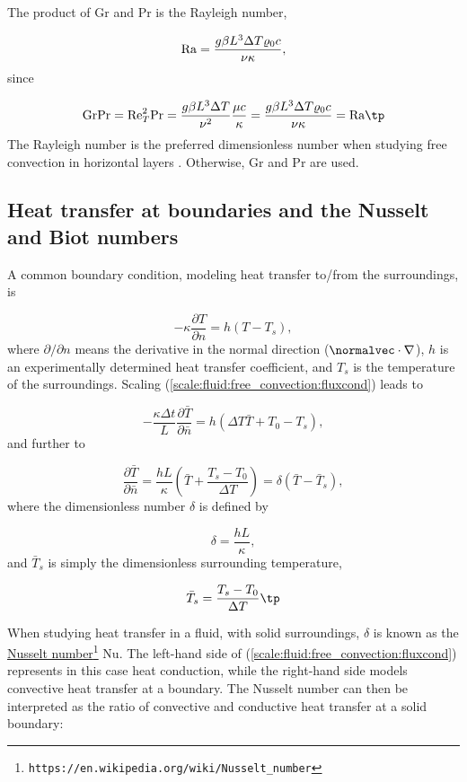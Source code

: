\documentclass[graybox,envcountchap,sectrefs,final]{svmonodo}
\begin{document}
The product of Gr and Pr is the Rayleigh number,

\[
\hbox{Ra} = \frac{g\beta L^3\Delta T\varrho_0 c}{\nu\kappa},
\]
since

\[
\hbox{Gr} \hbox{Pr} = \hbox{Re}_T^2\hbox{Pr} =
\frac{g\beta L^3 \Delta T}{\nu^2}\frac{\mu c}{\kappa} =
\frac{g\beta L^3 \Delta T\varrho_0 c}{\nu\kappa} =
\hbox{Ra}\tp
\]
The Rayleigh number is the preferred dimensionless number when studying
free convection in horizontal layers \cite{Drazin_Reid,Tritton}. Otherwise,
Gr and Pr are used.


\subsection{Heat transfer at boundaries and the Nusselt and Biot numbers}


A common boundary condition, modeling heat transfer to/from the
surroundings, is

\begin{equation}
-\kappa\frac{\partial T}{\partial n} = h(T - T_s),
\label{scale:fluid:free_convection:fluxcond}
\end{equation}
where $\partial/\partial n$ means the derivative in the normal direction
($\normalvec\cdot\nabla$), $h$ is an experimentally determined
heat transfer coefficient, and $T_s$ is the temperature of
the surroundings. Scaling (\ref{scale:fluid:free_convection:fluxcond})
leads to

\[ -\frac{\kappa\Delta t}{L}\frac{\partial \bar T}{\partial \bar n} = h(\Delta T \bar T + T_0 - T_s),\]
and further to

\[ \frac{\partial \bar T}{\partial \bar n} =
\frac{hL}{\kappa}(\bar T + \frac{T_s - T_0}{\Delta T})
= \delta(\bar T - \bar T_s),
\]
where the dimensionless number $\delta$ is defined by

\[ \delta = \frac{hL}{\kappa},\]
and $\bar T_s$ is simply the dimensionless surrounding temperature,

\[ \bar T_s = \frac{T_s - T_0}{\Delta T}\tp\]

When studying heat transfer in a fluid, with solid surroundings,
$\delta$ is known as the \href{{https://en.wikipedia.org/wiki/Nusselt_number}}{Nusselt number}\footnote{\texttt{https://en.wikipedia.org/wiki/Nusselt\_number}} Nu.  The left-hand side
of (\ref{scale:fluid:free_convection:fluxcond}) represents in this case
heat conduction, while the right-hand side models convective heat
transfer at a boundary. The Nusselt number can then be interpreted as
the ratio of convective and conductive heat transfer at a solid
boundary:
\end{document}
